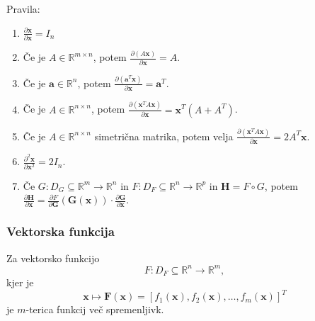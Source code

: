 \documentclass{article}
\begin{document}
\begin{multicols}{2}
	Pravila:
	\begin{enumerate}
		\item \(\frac{\partial \mathbf{x}}{\partial \mathbf{x}} = I_n\)
		\item Če je \(A \in \mathbb{R}^{m \times n}\), potem \(\frac{\partial (A\mathbf{x})}{\partial \mathbf{x}} = A\).
		\item Če je \(\mathbf{a} \in \mathbb{R}^n\), potem \(\frac{\partial (\mathbf{a}^T \mathbf{x})}{\partial \mathbf{x}} = \mathbf{a}^T\).
		\item Če je \(A \in \mathbb{R}^{n \times n}\), potem \(\frac{\partial (\mathbf{x}^T A \mathbf{x})}{\partial \mathbf{x}} = \mathbf{x}^T(A + A^T)\).
		\item Če je \(A \in \mathbb{R}^{n \times n}\) simetrična matrika, potem velja \(\frac{\partial (\mathbf{x}^T A \mathbf{x})}{\partial \mathbf{x}} = 2A^T\mathbf{x}\).
		\item \(\frac{\partial^2 \mathbf{x}}{\partial \mathbf{x}^2} = 2I_n\).
		\item Če \(G: D_G \subseteq \mathbb{R}^m \rightarrow \mathbb{R}^n\) in \(F: D_F \subseteq \mathbb{R}^n \rightarrow \mathbb{R}^p\) in \( \mathbf{H} = F \circ G\), potem \(\frac{\partial \mathbf{H}}{\partial \mathbf{x}} = \frac{\partial F}{\partial \mathbf{G}}(\mathbf{G}(\mathbf{x})) \cdot \frac{\partial \mathbf{G}}{\partial \mathbf{x}}\).
	\end{enumerate}


	\subsubsection{Vektorska funkcija}
	Za vektorsko funkcijo
	\[ F: D_F \subseteq \mathbb{R}^n \rightarrow \mathbb{R}^m, \]
	kjer je
	\[ \mathbf{x} \mapsto \mathbf{F}(\mathbf{x}) = [f_1(\mathbf{x}), f_2(\mathbf{x}), \ldots, f_m(\mathbf{x})]^T \]
	je \( m \)-terica funkcij več spremenljivk.


\end{multicols}
\end{document}
